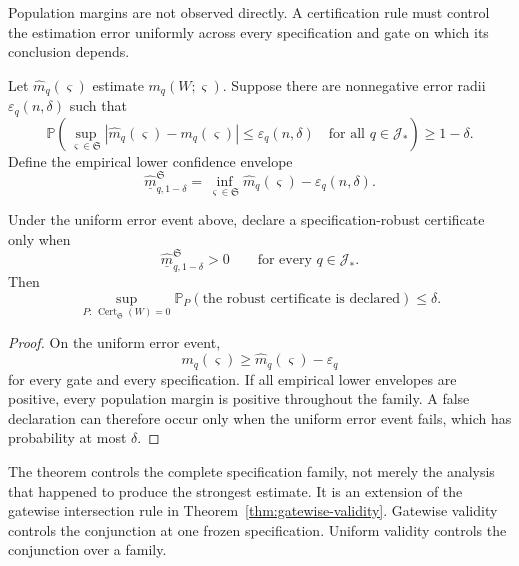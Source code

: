 
Population margins are not observed directly. A certification rule must
control the estimation error uniformly across every specification and gate on
which its conclusion depends.

Let \(\widehat m_q(\varsigma)\) estimate
\(m_q(W;\varsigma)\). Suppose there are nonnegative error radii
\(\varepsilon_q(n,\delta)\) such that
\[
\mathbb P\left(
\sup_{\varsigma\in\mathfrak S}
\left|
\widehat m_q(\varsigma)-m_q(\varsigma)
\right|
\leq
\varepsilon_q(n,\delta)
\quad\text{for all }q\in\mathcal J_*
\right)
\geq1-\delta.
\]
Define the empirical lower confidence envelope
\[
\boxed{
\widehat{\underline m}_{q,1-\delta}^{\mathfrak S}
=
\inf_{\varsigma\in\mathfrak S}
\widehat m_q(\varsigma)
-
\varepsilon_q(n,\delta).
}
\]


\begin{theorem}
\label{thm:uniform-spec-certification}
Under the uniform error event above, declare a specification-robust certificate
only when
\[
\widehat{\underline m}_{q,1-\delta}^{\mathfrak S}>0
\qquad
\text{for every }q\in\mathcal J_*.
\]
Then
\[
\boxed{
\sup_{P:\,\operatorname{Cert}_{\mathfrak S}(W)=0}
\mathbb P_P
\left(
\text{the robust certificate is declared}
\right)
\leq\delta.
}
\]
\end{theorem}

\begin{proof}
On the uniform error event,
\[
m_q(\varsigma)
\geq
\widehat m_q(\varsigma)-\varepsilon_q
\]
for every gate and every specification. If all empirical lower envelopes are
positive, every population margin is positive throughout the family. A false
declaration can therefore occur only when the uniform error event fails, which
has probability at most \(\delta\).
\end{proof}

The theorem controls the complete specification family, not merely the
analysis that happened to produce the strongest estimate. It is an extension
of the gatewise intersection rule in Theorem~\ref{thm:gatewise-validity}.
Gatewise validity controls the conjunction at one frozen specification.
Uniform validity controls the conjunction over a family.


